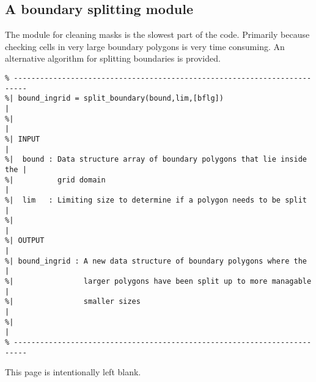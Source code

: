 \documentclass[12pt]{article}
\newcommand{\pb}{\strut \vfill \pagebreak}
\newcommand{\bpagea}{\strut

\vspace{2.5in} \centerline{This page is intentionally left blank.}}
\begin{document}
\subsection{A boundary splitting module}
The module for cleaning masks is the slowest part of the code. Primarily because checking cells in very large boundary polygons is very time consuming. An alternative algorithm for splitting boundaries is provided.
\begin{verbatim}
% -------------------------------------------------------------------------
%| bound_ingrid = split_boundary(bound,lim,[bflg])                        |
%|                                                                        |
%| INPUT                                                                  |
%|  bound : Data structure array of boundary polygons that lie inside the |
%|          grid domain                                                   |
%|  lim   : Limiting size to determine if a polygon needs to be split     |
%|                                                                        |
%| OUTPUT                                                                 |
%| bound_ingrid : A new data structure of boundary polygons where the     |
%|                larger polygons have been split up to more managable    |
%|                smaller sizes                                           |
%|                                                                        |
% -------------------------------------------------------------------------
\end{verbatim}

\bpagea
\pb
\end{document}
